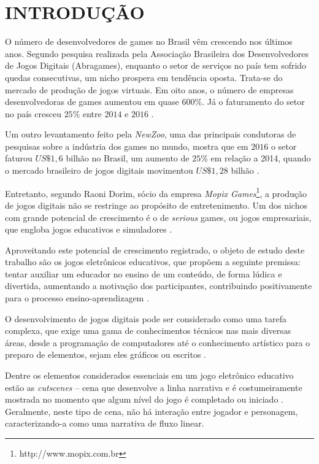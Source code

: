 
\chapter{INTRODUÇÃO}
\label{chap:introducao}

O número de desenvolvedores de games no Brasil vêm crescendo nos últimos anos. Segundo pesquisa realizada pela Associação Brasileira dos Desenvolvedores de Jogos Digitais (Abragames), enquanto o setor de serviços no país tem sofrido quedas consecutivas, um nicho prospera em tendência oposta. Trata-se do mercado de produção de jogos virtuais. Em oito anos, o número de empresas desenvolvedoras de games aumentou em quase $600\%$. Já o faturamento do setor no país cresceu $25\%$ entre $2014$ e $2016$ \cite{bib:globo2017}.

Um outro levantamento feito pela \textit{NewZoo}, uma das principais condutoras de pesquisas sobre a indústria dos games no mundo, mostra que em $2016$ o setor faturou $US\$ 1,6$ bilhão no Brasil, um aumento de $25\%$ em relação a 2014, quando o mercado brasileiro de jogos digitais movimentou $US\$ 1,28$ bilhão \cite{bib:globo2017}.

Entretanto, segundo Raoni Dorim, sócio da empresa \textit{Mopix Games}\footnote{http://www.mopix.com.br}, a produção de jogos digitais não se restringe ao propósito de entretenimento. Um dos nichos com grande potencial de crescimento é o de \textit{serious} games, ou jogos empresariais, que engloba jogos educativos e simuladores \cite{bib:globo2017}.

Aproveitando este potencial de crescimento registrado, o objeto de estudo deste trabalho são os jogos eletrônicos educativos, que propõem a seguinte premissa: tentar auxiliar um educador no ensino de um conteúdo, de forma lúdica e divertida, aumentando a motivação dos participantes, contribuindo positivamente para o processo ensino-aprendizagem \cite{bib:tori2010}.

O desenvolvimento de jogos digitais pode ser considerado como uma tarefa complexa, que exige uma gama de conhecimentos técnicos nas mais diversas áreas, desde a programação de computadores até o conhecimento artístico para o preparo de elementos, sejam eles gráficos ou escritos \cite{bib:bb2016}.

Dentre os elementos considerados essenciais em um jogo eletrônico educativo estão as \textit{cutscenes} -- cena que desenvolve a linha narrativa e é costumeiramente mostrada no momento que algum nível do jogo é completado ou iniciado \cite{bib:cs2016}. Geralmente, neste tipo de cena, não há interação entre jogador e personagem, caracterizando-a como uma narrativa de fluxo linear.

